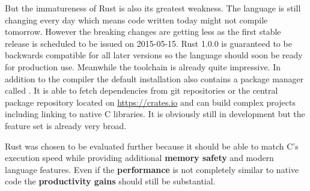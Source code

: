 But the immatureness of Rust is also its greatest weakness. The language is still changing every day which means code written today might not compile tomorrow. However the breaking changes are getting less as the first stable release is scheduled to be issued on 2015-05-15. Rust 1.0.0 is guaranteed to be backwards compatible for all later versions so the language should soon be ready for production use. Meanwhile the toolchain is already quite impressive. In addition to the compiler the default installation also contains a package manager called . It is able to fetch dependencies from git repositories or the central package repository located on \url{https://crates.io} and can build complex projects including linking to native C libraries. It is obviously still in development but the feature set is already very broad.

Rust was chosen to be evaluated further because it should be able to match C's execution speed while providing additional \textbf{memory safety} and modern language features. Even if the \textbf{performance} is not completely similar to native code the \textbf{productivity gains} should still be substantial.
